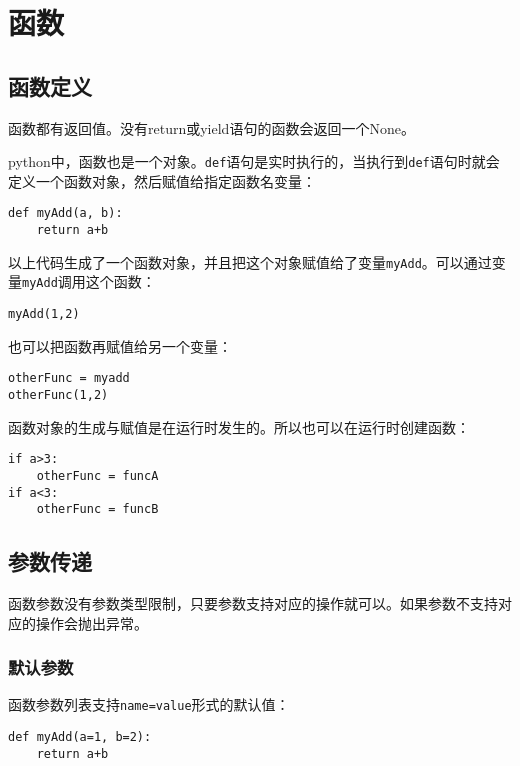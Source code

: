 
\chapter{函数}

	\section{函数定义}

		函数都有返回值。没有return或yield语句的函数会返回一个None。

		python中，函数也是一个对象。\verb|def|语句是实时执行的，当执行到\verb|def|语句时就会定义一个函数对象，然后赋值给指定函数名变量：

\begin{lstlisting}
def myAdd(a, b):
	return a+b
\end{lstlisting}

		以上代码生成了一个函数对象，并且把这个对象赋值给了变量\verb|myAdd|。可以通过变量\verb|myAdd|调用这个函数：

\begin{lstlisting}
myAdd(1,2)
\end{lstlisting}

		也可以把函数再赋值给另一个变量：

\begin{lstlisting}
otherFunc = myadd
otherFunc(1,2)
\end{lstlisting}

		函数对象的生成与赋值是在运行时发生的。所以也可以在运行时创建函数：

\begin{lstlisting}
if a>3:
	otherFunc = funcA
if a<3:
	otherFunc = funcB
\end{lstlisting}
		
	\section{参数传递}

		函数参数没有参数类型限制，只要参数支持对应的操作就可以。如果参数不支持对应的操作会抛出异常。

		\subsection{默认参数}
		函数参数列表支持\verb|name=value|形式的默认值：

\begin{lstlisting}
def myAdd(a=1, b=2):
	return a+b
\end{lstlisting}

